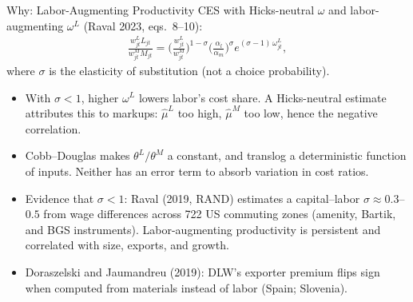 \documentclass[aspectratio=169,10pt]{beamer}
\begin{document}
\begin{frame}{Why: Labor-Augmenting Productivity}
\small
CES with Hicks-neutral $\omega$ and labor-augmenting $\omega^L$ (Raval 2023, eqs.\ 8--10):
\begin{align*}
\frac{w^L_{jt} L_{jt}}{w^M_{jt} M_{jt}} = \Big(\frac{w^L_{jt}}{w^M_{jt}}\Big)^{1-\sigma}\Big(\frac{\alpha_l}{\alpha_m}\Big)^{\sigma} e^{(\sigma - 1)\,\omega^L_{jt}},
\end{align*}
where $\sigma$ is the elasticity of substitution (not a choice probability).
\begin{itemize}
\item With $\sigma < 1$, higher $\omega^L$ \alert{lowers} labor's cost share. A Hicks-neutral estimate attributes this to markups: $\hat\mu^L$ too high, $\hat\mu^M$ too low, hence the negative correlation.
\item Cobb--Douglas makes $\theta^L/\theta^M$ a constant, and translog a deterministic function of inputs. Neither has an error term to absorb variation in cost ratios.
\item Evidence that $\sigma < 1$: Raval (2019, RAND) estimates a capital--labor $\sigma \approx 0.3$--$0.5$ from wage differences across 722 US commuting zones (amenity, Bartik, and BGS instruments). Labor-augmenting productivity is persistent and correlated with size, exports, and growth.
\item Doraszelski and Jaumandreu (2019): DLW's exporter premium \alert{flips sign} when computed from materials instead of labor (Spain; Slovenia).
\end{itemize}
\end{frame}
\end{document}
